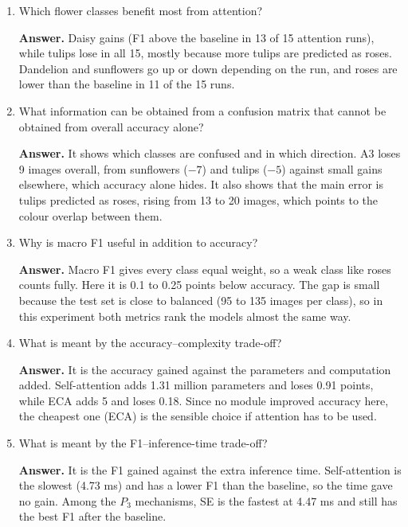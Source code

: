 \documentclass[10pt]{article}
\begin{document}
\begin{enumerate}
\textbf{Answer.} Yes, the Grad-CAM of the Channel+Spatial model changed for the two wrong images. The internal maps look alike. This is based on only five images. In one wrong image the map became a narrow band on the petal tips, and in the other it moved off the flower to the ground.

\item Which flower classes benefit most from attention?

\textbf{Answer.} Daisy gains (F1 above the baseline in 13 of 15 attention runs), while tulips lose in all 15, mostly because more tulips are predicted as roses. Dandelion and sunflowers go up or down depending on the run, and roses are lower than the baseline in 11 of the 15 runs.

\item What information can be obtained from a confusion matrix that cannot be obtained from overall accuracy alone?

\textbf{Answer.} It shows which classes are confused and in which direction. A3 loses 9 images overall, from sunflowers ($-7$) and tulips ($-5$) against small gains elsewhere, which accuracy alone hides. It also shows that the main error is tulips predicted as roses, rising from 13 to 20 images, which points to the colour overlap between them.

\item Why is macro F1 useful in addition to accuracy?

\textbf{Answer.} Macro F1 gives every class equal weight, so a weak class like roses counts fully. Here it is 0.1 to 0.25 points below accuracy. The gap is small because the test set is close to balanced (95 to 135 images per class), so in this experiment both metrics rank the models almost the same way.

\item What is meant by the accuracy--complexity trade-off?

\textbf{Answer.} It is the accuracy gained against the parameters and computation added. Self-attention adds 1.31 million parameters and loses 0.91 points, while ECA adds 5 and loses 0.18. Since no module improved accuracy here, the cheapest one (ECA) is the sensible choice if attention has to be used.

\item What is meant by the F1--inference-time trade-off?

\textbf{Answer.} It is the F1 gained against the extra inference time. Self-attention is the slowest (4.73 ms) and has a lower F1 than the baseline, so the time gave no gain. Among the $P_3$ mechanisms, SE is the fastest at 4.47 ms and still has the best F1 after the baseline.


\end{enumerate}
\end{document}
